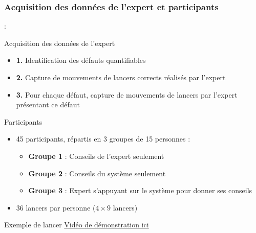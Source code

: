 \documentclass[svgnames]{beamer}
\begin{document}
	\subsubsection{Acquisition des données de l'expert et participants}
	\begin{frame}{\subsecname : \subsubsecname}
		\begin{block}{Acquisition des données de l'expert}
			\begin{itemize}
				\item \textbf{1.} Identification des défauts quantifiables
				\item \textbf{2.} Capture de mouvements de lancers corrects réalisés par l'expert
				\item \textbf{3.} Pour chaque défaut, capture de mouvements de lancers par l'expert présentant ce défaut 
			\end{itemize}
		\end{block}
	
		\begin{block}{Participants}
			\begin{itemize}[label=$\bullet$]
				\item 45 participants, répartis en 3 groupes de 15 personnes :
				\begin{itemize}
					\item \textbf{Groupe 1} : Conseils de l'expert seulement
					\item \textbf{Groupe 2} : Conseils du système seulement
					\item \textbf{Groupe 3} : Expert s'appuyant sur le système pour donner ses conseils
				\end{itemize}
				\item 36 lancers par personne ($4 \times 9$ lancers)
			\end{itemize}
		\end{block}
	\end{frame}
	
	\begin{frame}{Exemple de lancer}
	\centering
	\href{run:img/darts_throwing_2.mp4}{Vidéo de démonstration ici}
	\end{frame}
	
\end{document}

